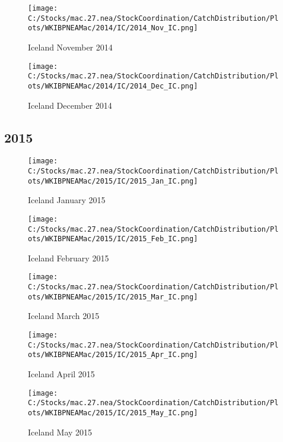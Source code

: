 \documentclass{article}
\begin{document}
\begin{figure}
	\centering
		\texttt{[image: C:/Stocks/mac.27.nea/StockCoordination/CatchDistribution/Plots/WKIBPNEAMac/2014/IC/2014\_Nov\_IC.png]}
	\caption{Iceland November 2014}
	\label{fig:2014_Nov_IC}
\end{figure}

\begin{figure}
	\centering
		\texttt{[image: C:/Stocks/mac.27.nea/StockCoordination/CatchDistribution/Plots/WKIBPNEAMac/2014/IC/2014\_Dec\_IC.png]}
	\caption{Iceland December 2014}
	\label{fig:2014_Dec_IC}
\end{figure}

\clearpage

\newpage

\subsection{2015}



\begin{figure}[h]
	\centering
		\texttt{[image: C:/Stocks/mac.27.nea/StockCoordination/CatchDistribution/Plots/WKIBPNEAMac/2015/IC/2015\_Jan\_IC.png]}
	\caption{Iceland January 2015}
	\label{fig:2015_Jan_IC}
\end{figure}

\begin{figure}
	\centering
		\texttt{[image: C:/Stocks/mac.27.nea/StockCoordination/CatchDistribution/Plots/WKIBPNEAMac/2015/IC/2015\_Feb\_IC.png]}
	\caption{Iceland February 2015}
	\label{fig:2015_Feb_IC}
\end{figure}

\begin{figure}
	\centering
		\texttt{[image: C:/Stocks/mac.27.nea/StockCoordination/CatchDistribution/Plots/WKIBPNEAMac/2015/IC/2015\_Mar\_IC.png]}
	\caption{Iceland March 2015}
	\label{fig:2015_Mar_IC}
\end{figure}

\begin{figure}
	\centering
		\texttt{[image: C:/Stocks/mac.27.nea/StockCoordination/CatchDistribution/Plots/WKIBPNEAMac/2015/IC/2015\_Apr\_IC.png]}
	\caption{Iceland April 2015}
	\label{fig:2015_Apr_IC}
\end{figure}

\begin{figure}
	\centering
		\texttt{[image: C:/Stocks/mac.27.nea/StockCoordination/CatchDistribution/Plots/WKIBPNEAMac/2015/IC/2015\_May\_IC.png]}
	\caption{Iceland May 2015}
	\label{fig:2015_May_IC}
\end{figure}
\end{document}
